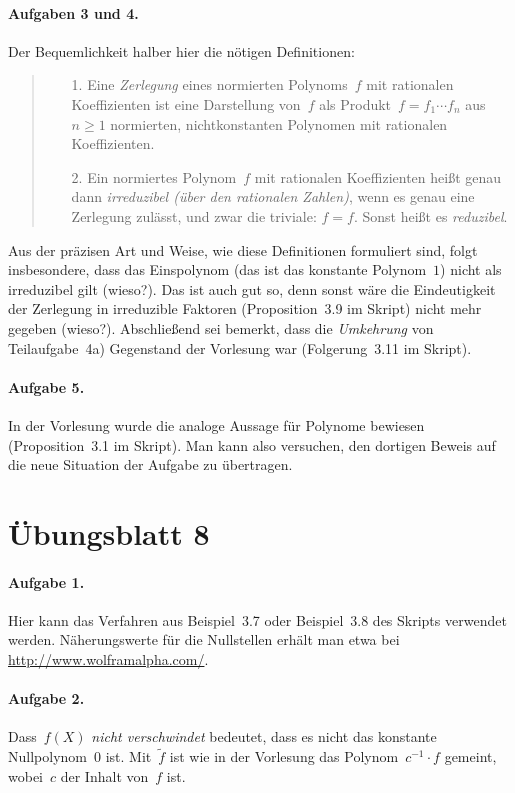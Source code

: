 \documentclass{../algblatt}
\begin{document}
\paragraph{Aufgaben 3 und 4.} Der Bequemlichkeit halber hier die nötigen
Definitionen:
\begin{quote}
\begin{enumerate}
\item[1.] Eine \emph{Zerlegung} eines normierten Polynoms~$f$ mit rationalen
Koeffizienten ist eine Darstellung von~$f$ als Produkt~$f = f_1 \cdots f_n$
aus~$n \geq 1$ normierten, nichtkonstanten Polynomen mit rationalen
Koeffizienten.
\item[2.] Ein normiertes Polynom~$f$ mit rationalen Koeffizienten heißt genau
dann \emph{irreduzibel (über den rationalen Zahlen)}, wenn es genau eine
Zerlegung zulässt, und zwar die triviale: $f = f$. Sonst heißt es
\emph{reduzibel}.
\end{enumerate}
\end{quote}
Aus der präzisen Art und Weise, wie diese Definitionen formuliert sind, folgt
insbesondere, dass das Einspolynom (das ist das konstante Polynom~$1$) nicht
als irreduzibel gilt (wieso?). Das ist auch gut so, denn sonst wäre die
Eindeutigkeit der Zerlegung in irreduzible Faktoren (Proposition~3.9 im Skript)
nicht mehr gegeben (wieso?). Abschließend sei bemerkt, dass die
\emph{Umkehrung} von Teilaufgabe~4a) Gegenstand der Vorlesung war
(Folgerung~3.11 im Skript).

\paragraph{Aufgabe 5.} In der Vorlesung wurde die analoge Aussage für Polynome
bewiesen (Proposition~3.1 im Skript). Man kann also versuchen, den dortigen
Beweis auf die neue Situation der Aufgabe zu übertragen.


\section*{Übungsblatt 8}

\paragraph{Aufgabe 1.} Hier kann das Verfahren aus Beispiel~3.7 oder
Beispiel~3.8 des Skripts verwendet werden. Näherungswerte für die Nullstellen
erhält man etwa bei \url{http://www.wolframalpha.com/}.

\paragraph{Aufgabe 2.} Dass~$f(X)$ \emph{nicht verschwindet} bedeutet, dass es
nicht das konstante Nullpolynom~$0$ ist. Mit~$\widetilde f$ ist wie in der Vorlesung das
Polynom~$c^{-1} \cdot f$ gemeint, wobei~$c$ der Inhalt von~$f$ ist.
\end{document}
